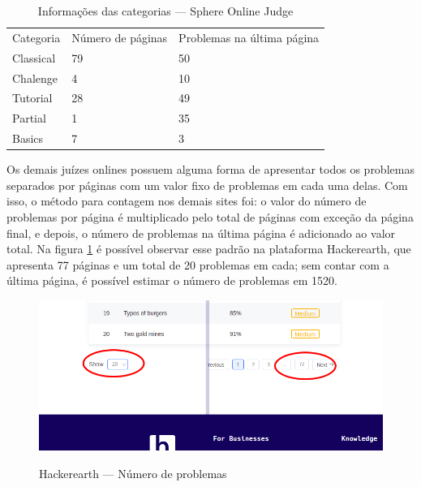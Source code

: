 \begin{table}[ht]
    \caption[Caption for LOF]{Informações das categorias — Sphere Online Judge \footnotemark}
    \centering
    \label{table:spoj_categories}
\begin{tabular}{lll}
\rowcolor[HTML]{CBCEFB} 
Categoria & Número de páginas & Problemas na última página \\
Classical & 79                & 50                         \\
Chalenge  & 4                 & 10                         \\
Tutorial  & 28                & 49                         \\
Partial   & 1                 & 35                         \\
Basics    & 7                 & 3                         
\end{tabular}
\end{table}

Os demais juízes onlines possuem alguma forma de apresentar todos os problemas separados por páginas com um valor fixo de problemas em cada uma delas. Com isso, o método para contagem nos demais sites foi: o valor do número de problemas por página é multiplicado pelo total de páginas com exceção da página final, e depois, o número de problemas na última página é adicionado ao valor total. Na figura \ref{fig:hackerearth_numero_problemas} é possível observar esse padrão na plataforma Hackerearth, que apresenta 77 páginas e um total de 20 problemas em cada; sem contar com a última página, é possível estimar o número de problemas em 1520.
 
\begin{figure}[H]
    \centering
    \caption{Hackerearth — Número de problemas}
    \includegraphics[keepaspectratio=true,scale=0.45]{figuras/hackerearth_numero_problemas.png}
    \label{fig:hackerearth_numero_problemas}
\end{figure}

